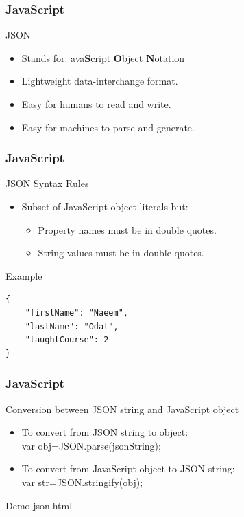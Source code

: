 \documentclass[xcolor=dvipsnames,10pt]{beamer}
\begin{document}
\begin{frame}[fragile]
\frametitle{JavaScript}
\begin{block}{JSON}
\begin{itemize}
	\item Stands for: {\color{red}{\bf J}ava{\bf S}cript {\bf O}bject {\bf N}otation}
	\item Lightweight data-interchange format.
	\item Easy for humans to read and write.
	\item Easy for machines to parse and generate.
\end{itemize}
\end{block}
\end{frame}
\begin{frame}[fragile]
\frametitle{JavaScript}
\begin{block}{JSON Syntax Rules}
\begin{itemize}
	\item Subset of JavaScript object literals but:
	\begin{itemize}
		\item Property names must be in double quotes.
		\item String values must be in double quotes.
	\end{itemize}
\end{itemize}			
\end{block}
\begin{block}{Example}
\begin{verbatim}
{
    "firstName": "Naeem",
    "lastName": "Odat",
    "taughtCourse": 2
}
\end{verbatim}
\end{block}
\end{frame}
\begin{frame}[fragile]
\frametitle{JavaScript}
\begin{block}{Conversion between JSON string and JavaScript object}
\begin{itemize}
	\item To convert from JSON string to object:\\
	{\color{red}var obj=JSON.parse(jsonString);}
	\item To convert from JavaScript object to JSON string:\\
	{\color{red}var str=JSON.stringify(obj);}
\end{itemize}
\end{block}
\begin{block}{Demo}
json.html
\end{block}
\end{frame}
\end{document}
